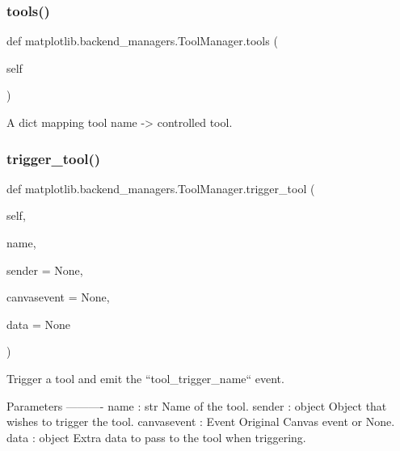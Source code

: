 \subsubsection{\texorpdfstring{tools()}{tools()}}
{\footnotesize\ttfamily def matplotlib.\+backend\+\_\+managers.\+Tool\+Manager.\+tools (\begin{DoxyParamCaption}\item[{}]{self }\end{DoxyParamCaption})}

\begin{DoxyVerb}A dict mapping tool name -> controlled tool.\end{DoxyVerb}
 \mbox{\label{classmatplotlib_1_1backend__managers_1_1ToolManager_aa251334d40971469f162ff354045ebbc}} 
\subsubsection{\texorpdfstring{trigger\+\_\+tool()}{trigger\_tool()}}
{\footnotesize\ttfamily def matplotlib.\+backend\+\_\+managers.\+Tool\+Manager.\+trigger\+\_\+tool (\begin{DoxyParamCaption}\item[{}]{self,  }\item[{}]{name,  }\item[{}]{sender = {\ttfamily None},  }\item[{}]{canvasevent = {\ttfamily None},  }\item[{}]{data = {\ttfamily None} }\end{DoxyParamCaption})}

\begin{DoxyVerb}Trigger a tool and emit the ``tool_trigger_{name}`` event.

Parameters
----------
name : str
    Name of the tool.
sender : object
    Object that wishes to trigger the tool.
canvasevent : Event
    Original Canvas event or None.
data : object
    Extra data to pass to the tool when triggering.
\end{DoxyVerb}
 \mbox{\label{classmatplotlib_1_1backend__managers_1_1ToolManager_aff7f44850960745d2cead7d2ea7ede1d}} 

